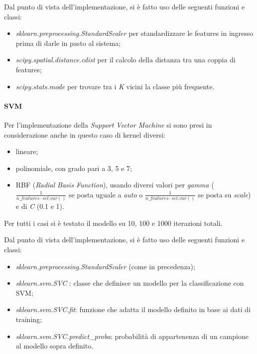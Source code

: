 \documentclass[11pt, a4paper, titlepage]{article}
\begin{document}
\medskip
Dal punto di vista dell'implementazione, si è fatto uso delle seguenti funzioni e classi:
\begin{itemize}
    \item \emph{sklearn.preprocessing.StandardScaler} \cite{scikit-learn} per standardizzare le features in ingresso prima di darle in pasto al sistema;
    \item \emph{scipy.spatial.distance.cdist} \cite{scipy} per il calcolo della distanza tra una coppia di features;
    \item \emph{scipy.stats.mode} \cite{scipy} per trovare tra i \emph{K} vicini la classe più frequente.  
\end{itemize}

\paragraph{SVM}
Per l'implementazione della \emph{Support Vector Machine} si sono presi in considerazione anche in questo caso di kernel diversi:
\begin{itemize}
    \item lineare; 
    \item polinomiale, con grado pari a 3, 5 e 7;
    \item RBF (\emph{Radial Basis Function}), usando diversi valori per \emph{gamma} ($\frac{1}{n\_features \cdot set.var()}$ se posta uguale a \emph{auto} o $\frac{1}{n\_features \cdot set.var()}$ se posta su \emph{scale}) e di \emph{C} (0.1 e 1).
\end{itemize}
Per tutti i casi si è testato il modello su 10, 100 e 1000 iterazioni totali.

\medskip
Dal punto di vista dell'implementazione, si è fatto uso delle seguenti funzioni e classi:
\begin{itemize}
    \item \emph{sklearn.preprocessing.StandardScaler} \cite{scikit-learn} (come in precedenza);
    \item \emph{sklearn.svm.SVC} \cite{scikit-learn}: classe che definisce un modello per la classificazione con SVM;
    \item \emph{sklearn.svm.SVC.fit}: funzione che adatta il modello definito in base ai dati di training;
    \item \emph{sklearn.svm.SVC.predict\_proba}: probabilità di appartenenza di un campione al modello sopra definito.
\end{itemize}
\end{document}
